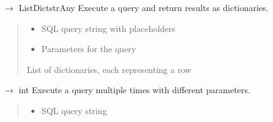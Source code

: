 \documentclass[letterpaper,10pt,english]{sphinxmanual}
\begin{document}
\begin{fulllineitems}
\begin{fulllineitems}
\label{\detokenize{core.database.sqlite_adapter:core.database.sqlite_adapter.SQLiteAdapter.execute}}
\pysigstartsignatures
\pysiglinewithargsret
{}
{\sphinxparamcomma {}}
{{ $\rightarrow$ List\DUrole{p}{{[}}Dict\DUrole{p}{{[}}strAny\DUrole{p}{{]}}\DUrole{p}{{]}}}}
\pysigstopsignatures
\sphinxAtStartPar
Execute a query and return results as dictionaries.
\begin{quote}\begin{description}
\begin{itemize}
\item {} 
\sphinxAtStartPar
{} \textendash{} SQL query string with placeholders

\item {} 
\sphinxAtStartPar
{} \textendash{} Parameters for the query

\end{itemize}

\sphinxAtStartPar
List of dictionaries, each representing a row

\end{description}\end{quote}

\end{fulllineitems}


\begin{fulllineitems}
\label{\detokenize{core.database.sqlite_adapter:core.database.sqlite_adapter.SQLiteAdapter.execute_many}}
\pysigstartsignatures
\pysiglinewithargsret
{}
{\sphinxparamcomma {}}
{{ $\rightarrow$ int}}
\pysigstopsignatures
\sphinxAtStartPar
Execute a query multiple times with different parameters.
\begin{quote}\begin{description}
\begin{itemize}
\item {} 
\sphinxAtStartPar
{} \textendash{} SQL query string


\end{itemize}
\end{description}
\end{quote}
\end{fulllineitems}
\end{fulllineitems}
\end{document}
